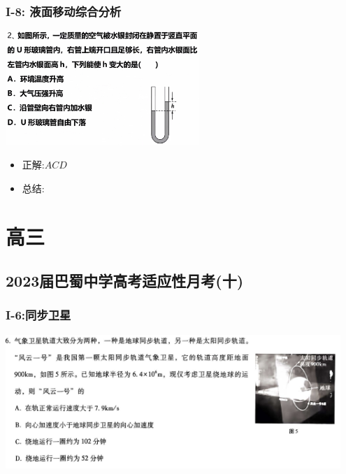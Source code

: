 \documentclass{article}
\begin{document}
\subsubsection{I-8: 液面移动综合分析 }
\includegraphics[width = 0.55\textwidth,keepaspectratio]{./pictures/2.3-9.png}

\begin{itemize}
    \item 正解:\quad $ACD$
    \item 总结:\quad

          \hspace{3em}\begin{minipage}{0.88\textwidth}

          \end{minipage}
\end{itemize}


\vspace{2em}

\section{高三}

\subsection{2023届巴蜀中学高考适应性月考(十)}
\subsubsection{I-6:同步卫星}
\includegraphics[width = 0.95\textwidth,keepaspectratio]{./pictures/3.1-1.png}
\end{document}
